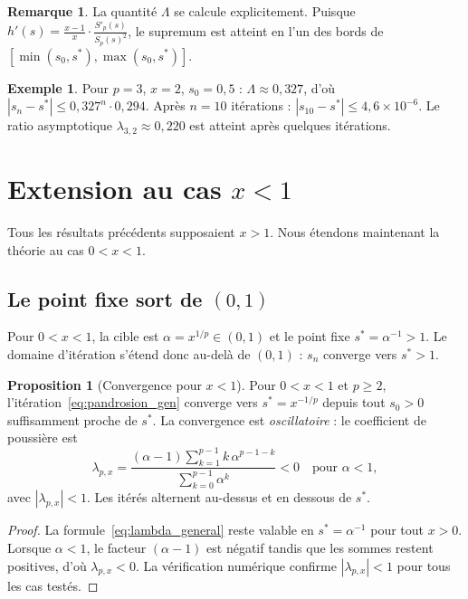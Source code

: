 \documentclass[11pt,a4paper]{article}
\theoremstyle{definition}
\newtheorem{proposition}{Proposition}[section]
\newtheorem{remark}{Remarque}[section]
\newtheorem{example}{Exemple}[section]
\begin{document}
\begin{remark}
La quantité $\Lambda$ se calcule explicitement. Puisque $h'(s) = \frac{x-1}{x} \cdot \frac{S'_p(s)}{S_p(s)^2}$, le supremum est atteint en l'un des bords de $[\min(s_0, s^*), \max(s_0, s^*)]$.
\end{remark}

\begin{example}
Pour $p = 3$, $x = 2$, $s_0 = 0{,}5$ : $\Lambda \approx 0{,}327$, d'où $|s_n - s^*| \leq 0{,}327^n \cdot 0{,}294$. Après $n = 10$ itérations : $|s_{10} - s^*| \leq 4{,}6 \times 10^{-6}$. Le ratio asymptotique $\lambda_{3,2} \approx 0{,}220$ est atteint après quelques itérations.
\end{example}

\section{Extension au cas \texorpdfstring{$x < 1$}{x < 1}}
\label{sec:extension_x_less_1}

Tous les résultats précédents supposaient $x > 1$. Nous étendons maintenant la théorie au cas $0 < x < 1$.

\subsection{Le point fixe sort de $(0,1)$}

Pour $0 < x < 1$, la cible est $\alpha = x^{1/p} \in (0,1)$ et le point fixe $s^* = \alpha^{-1} > 1$. Le domaine d'itération s'étend donc au-delà de $(0,1)$ : $s_n$ converge vers $s^* > 1$.

\begin{proposition}[Convergence pour $x < 1$]
\label{prop:x_small}
Pour $0 < x < 1$ et $p \geq 2$, l'itération~\eqref{eq:pandrosion_gen} converge vers $s^* = x^{-1/p}$ depuis tout $s_0 > 0$ suffisamment proche de $s^*$. La convergence est \emph{oscillatoire} : le coefficient de poussière est
\[
  \lambda_{p,x} = \frac{(\alpha - 1)\sum_{k=1}^{p-1}k\,\alpha^{p-1-k}}{\sum_{k=0}^{p-1}\alpha^k} < 0 \quad \text{pour } \alpha < 1,
\]
avec $|\lambda_{p,x}| < 1$. Les itérés alternent au-dessus et en dessous de $s^*$.
\end{proposition}

\begin{proof}
La formule~\eqref{eq:lambda_general} reste valable en $s^* = \alpha^{-1}$ pour tout $x > 0$. Lorsque $\alpha < 1$, le facteur $(\alpha - 1)$ est négatif tandis que les sommes restent positives, d'où $\lambda_{p,x} < 0$. La vérification numérique confirme $|\lambda_{p,x}| < 1$ pour tous les cas testés.
\end{proof}
\end{document}
